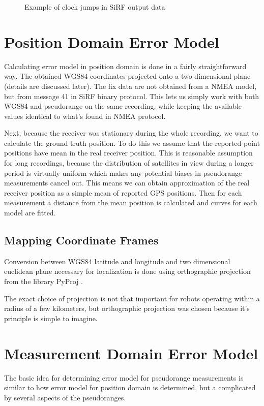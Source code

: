 \begin{figure}[tp]
	\centering
	\caption{Example of clock jumps in SiRF output data}
	\label{fig:impl-clock-jumps}
\end{figure}

\section{Position Domain Error Model}
Calculating error model in position domain is done in a fairly straightforward way.
The obtained WGS84 coordinates projected onto a two dimensional plane
(details are discussed later).
The fix data are not obtained from a NMEA model, but from message 41 in SiRF
binary protocol.
This lets us simply work with both WGS84 and pseudorange on the same recording,
while keeping the available values identical to what's found in NMEA protocol.

Next, because the receiver was stationary during the whole recording, we want to
calculate the ground truth position.
To do this we assume that the reported point positions have mean in the real receiver position.
This is reasonable assumption for long recordings,
because the distribution of satellites in view during a longer period is
virtually uniform which makes any potential biases in pseudorange measurements
cancel out.
This means we can obtain approximation of the real receiver position as a simple
mean of reported GPS positions.
Then for each measurement a distance from the mean position is calculated and
curves for each model are fitted.

\subsection{Mapping Coordinate Frames}
\label{sec:impl-coordinates}
Conversion between WGS84 latitude and longitude and two dimensional euclidean
plane necessary for localization is done using orthographic projection from
the library PyProj \cite{www-pyproj}.

The exact choice of projection is not that important for robots operating within
a radius of a few kilometers, but orthographic projection was chosen because
it's principle is simple to imagine.

\section{Measurement Domain Error Model}
The basic idea for determining error model for pseudorange measurements is
similar to how error model for position domain is determined, but a complicated
by several aspects of the pseudoranges.

